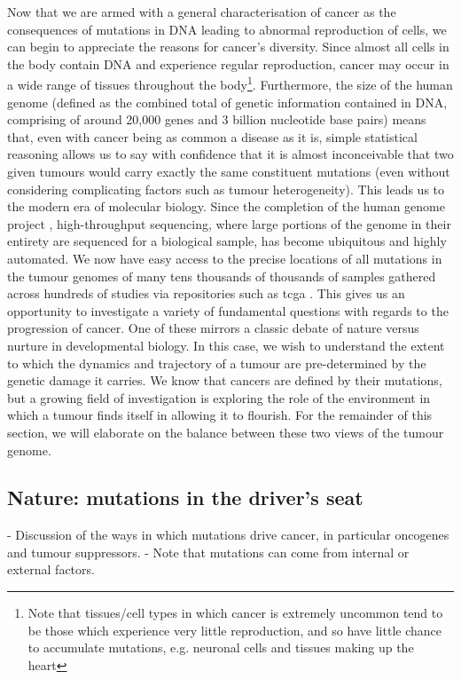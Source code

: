 \documentclass[10pt,twoside,openright]{report}
\begin{document}
Now that we are armed with a general characterisation of cancer as the consequences of mutations in DNA leading to abnormal reproduction of cells, we can begin to appreciate the reasons for cancer's diversity. Since almost all cells in the body contain DNA and experience regular reproduction, cancer may occur in a wide range of tissues throughout the body\footnote{Note that tissues/cell types in which cancer is extremely uncommon tend to be those which experience very little reproduction, and so have little chance to accumulate mutations, e.g. neuronal cells and tissues making up the heart}. Furthermore, the size of the human genome (defined as the combined total of genetic information contained in DNA, comprising of around 20,000 genes and 3 billion nucleotide base pairs) means that, even with cancer being as common a disease as it is, simple statistical reasoning allows us to say with confidence that it is almost inconceivable that two given tumours would carry exactly the same constituent mutations (even without considering complicating factors such as tumour heterogeneity). This leads us to the modern era of molecular biology. Since the completion of the human genome project \citep{lander_initial_2001}, high-throughput sequencing, where large portions of the genome in their entirety are sequenced for a biological sample, has become ubiquitous and highly automated. We now have easy access to the precise locations of all mutations in the tumour genomes of many tens thousands of thousands of samples gathered across hundreds of studies via repositories such as \acrfull{tcga} \citep{weinstein_cancer_2013}. This gives us an opportunity to investigate a variety of fundamental questions with regards to the progression of cancer. One of these mirrors a classic debate of nature versus nurture in developmental biology. In this case, we wish to understand the extent to which the dynamics and trajectory of a tumour are pre-determined by the genetic damage it carries. We know that cancers are defined by their mutations, but a growing field of investigation is exploring the role of the environment in which a tumour finds itself in allowing it to flourish. For the remainder of this section, we will elaborate on the balance between these two views of the tumour genome.
\subsection{Nature: mutations in the driver's seat}
- Discussion of the ways in which mutations drive cancer, in particular oncogenes and tumour suppressors.
- Note that mutations can come from internal or external factors.
\end{document}
